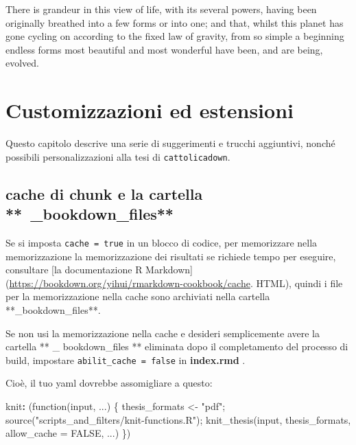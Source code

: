 \documentclass[a4paper, 11pt, nobind]{templates/ociamthesis}
\newenvironment{Shaded}{\begin{snugshade}}{\end{snugshade}}
\newcommand{\AttributeTok}[1]{\textcolor[rgb]{0.77,0.63,0.00}{#1}}
\newcommand{\FunctionTok}[1]{\textcolor[rgb]{0.00,0.00,0.00}{#1}}
\newcommand{\KeywordTok}[1]{\textcolor[rgb]{0.13,0.29,0.53}{\textbf{#1}}}
\renewenvironment{Shaded}
{
  \vspace{10pt}%
  \begin{snugshade}%
}{%
  \end{snugshade}%
  \vspace{8pt}%
}
\begin{document}
\begin{savequote}
There is grandeur in this view of life, with its several powers, having
been originally breathed into a few forms or into one; and that, whilst
this planet has gone cycling on according to the fixed law of gravity,
from so simple a beginning endless forms most beautiful and most
wonderful have been, and are being, evolved.
\end{savequote}



\hypertarget{customizzazioni-ed-estensioni}{%
\chapter{Customizzazioni ed estensioni}\label{customizzazioni-ed-estensioni}}

\minitoc 

\noindent Questo capitolo descrive una serie di suggerimenti e trucchi aggiuntivi, nonché possibili personalizzazioni alla tesi di \texttt{cattolicadown}.

\hypertarget{cache-di-chunk-e-la-cartella-_bookdown_files}{%
\section{cache di chunk e la cartella **~\_bookdown\_files**}\label{cache-di-chunk-e-la-cartella-_bookdown_files}}

Se si imposta \texttt{cache\ =\ true} in un blocco di codice, per memorizzare nella memorizzazione la memorizzazione dei risultati se richiede tempo per eseguire, consultare {[}la documentazione R Markdown{]} (\url{https://bookdown.org/yihui/rmarkdown-cookbook/cache}. HTML), quindi i file per la memorizzazione nella cache sono archiviati nella cartella **\_bookdown\_files**.

Se non usi la memorizzazione nella cache e desideri semplicemente avere la cartella ** \_ bookdown\_files ** eliminata dopo il completamento del processo di build, impostare \texttt{abilit\_cache\ =\ false} in \textbf{index.rmd }.

Cioè, il tuo yaml dovrebbe assomigliare a questo:

\begin{Shaded}
\begin{Highlighting}[]
\FunctionTok{knit}\KeywordTok{:}\AttributeTok{ (function(input, ...) \{}
\AttributeTok{    thesis\_formats \textless{}{-} "pdf";}
\AttributeTok{    }
\AttributeTok{    source("scripts\_and\_filters/knit{-}functions.R");}
\AttributeTok{    knit\_thesis(input, thesis\_formats, allow\_cache = FALSE, ...)}
\AttributeTok{  \})}
\end{Highlighting}
\end{Shaded}
\end{document}
